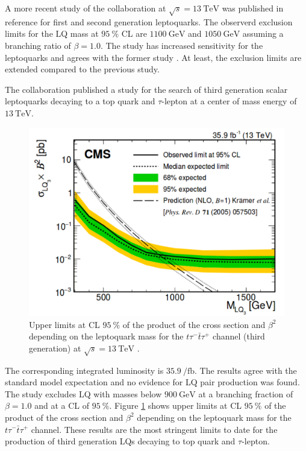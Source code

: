 A more recent study of the {\ATLAS} collaboration at $\sqrt{s}=\SI{13}{\tera\electronvolt}$ was published in reference \cite{currentStatus:13TeVATLAS} for first and second generation leptoquarks. The observerd exclusion limits for the LQ mass at $\SI{95}{\percent}$ CL are $\SI{1100}{\giga\electronvolt}$ and $\SI{1050}{\giga\electronvolt}$ assuming a branching ratio of $\beta=1.0$. The study has increased sensitivity for the leptoquarks and agrees with the former study \cite{currentStatus:8TeVATLAS}. At least, the exclusion limits are extended \cite{currentStatus:13TeVATLAS} compared to the previous study.\par
The {\CMS} collaboration published a study for the search of third generation scalar leptoquarks decaying to a top quark and $\tau$-lepton at a center of mass energy of $\SI{13}{\tera\electronvolt}$.
%
\begin{figure}[htbp]                                 
 \begin{center}                                       
  \includegraphics[width=0.6\linewidth]{figures/exclusionLQ.pdf} 
   \caption[Upper limits of the product of the cross section and $\beta^2$ depending on the leptoquark mass for the $t\tau^-\bar{t}\tau^+$ channel.]{Upper limits at CL $\SI{95}{\percent}$ of the product of the cross section and $\beta^2$ depending on the leptoquark mass for the $t\tau^-\bar{t}\tau^+$ channel (third generation) at $\sqrt{s}=\SI{13}{\tera\electronvolt}$ \cite{currentStatus:13TeVATLAS}.}
  \label{exclusionLQ}                                     
 \end{center}
\end{figure}
%
The corresponding integrated luminosity is $\SI{35.9}{\per\femto\barn}$. The results agree with the standard model expectation and no evidence for LQ pair production was found. The study excludes LQ with masses below $\SI{900}{\giga\electronvolt}$ at a branching fraction of $\beta=1.0$ and at a CL of $\SI{95}{\percent}$. Figure \ref{exclusionLQ} shows upper limits at CL $\SI{95}{\percent}$ of the product of the cross section and $\beta^2$ depending on the leptoquark mass for the $t\tau^-\bar{t}\tau^+$ channel. These results are the most stringent limits to date for the production of third generation LQs decaying to top quark and $\tau$-lepton. \cite{currentStatus:13TeVCMS}\par

